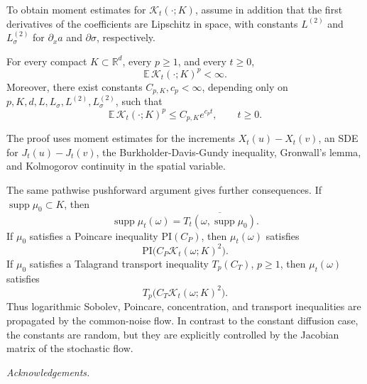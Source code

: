 \documentclass[12pt]{article}
\begin{document}
To obtain moment estimates for $\mathcal K_t(\cdot;K)$, assume in addition that
the first derivatives of the coefficients are Lipschitz in space, with
constants $L^{(2)}$ and $L_\sigma^{(2)}$ for $\partial_xa$ and
$\partial\sigma$, respectively.

\begin{proposition}
    For every compact $K\subset\mathbb R^d$, every $p\ge1$, and every $t\ge0$,
    \begin{equation}
        \mathbb E\,\mathcal K_t(\cdot;K)^p<\infty.
    \end{equation}
    Moreover, there exist constants $C_{p,K},c_p<\infty$, depending only on
    $p,K,d,L,L_\sigma,L^{(2)},L_\sigma^{(2)}$, such that
    \begin{equation}
        \mathbb E\,\mathcal K_t(\cdot;K)^p\le C_{p,K}e^{c_pt},
        \qquad t\ge0.
    \end{equation}
\end{proposition}

The proof uses moment estimates for the increments $X_t(u)-X_t(v)$, an SDE for
$J_t(u)-J_t(v)$, the Burkholder-Davis-Gundy inequality, Gronwall's lemma, and
Kolmogorov continuity in the spatial variable.

The same pathwise pushforward argument gives further consequences.  If
$\operatorname{supp}\mu_0\subset K$, then
\begin{equation}
    \operatorname{supp}\mu_t(\omega)
    =\overline{T_t(\omega,\operatorname{supp}\mu_0)}.
\end{equation}
If $\mu_0$ satisfies a Poincare inequality $\mathrm{PI}(C_P)$, then
$\mu_t(\omega)$ satisfies
\begin{equation}
    \mathrm{PI}\bigl(C_P\mathcal K_t(\omega;K)^2\bigr).
\end{equation}
If $\mu_0$ satisfies a Talagrand transport inequality $T_p(C_T)$, $p\ge1$,
then $\mu_t(\omega)$ satisfies
\begin{equation}
    T_p\bigl(C_T\mathcal K_t(\omega;K)^2\bigr).
\end{equation}
Thus logarithmic Sobolev, Poincare, concentration, and transport inequalities
are propagated by the common-noise flow.  In contrast to the constant diffusion
case, the constants are random, but they are explicitly controlled by the
Jacobian matrix of the stochastic flow.

\vskip 2mm
    {\small \textit{Acknowledgements.}}
\end{document}
